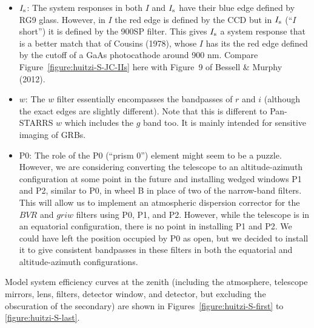 \begin{itemize}
\item $\mbox{$I_\mathrm{s}$}$: The system responses in both $I$ and $\mbox{$I_\mathrm{s}$}$ have their blue edge defined by RG9 glass. However, in $I$ the red edge is defined by the CCD but in $\mbox{$I_\mathrm{s}$}$ (“$I$ short”) it is defined by the 900SP filter. This gives $\mbox{$I_\mathrm{s}$}$ a system response that is a better match that of Cousins (1978), whose $I$ has its the red edge defined by the cutoff of a GaAs photocathode around 900 nm. Compare Figure~\ref{figure:huitzi-S-JC-IIs} here with Figure~9 of Bessell \& Murphy (2012).

\item
$w$: The $w$ filter essentially encompasses the bandpasses of $r$ and $i$ (although the exact edges are slightly different). Note that this is different to Pan-STARRS $w$ which includes the $g$ band too. It is mainly intended for sensitive imaging of GRBs.

\item P0: The role of the P0 (“prism 0”) element might seem to be a puzzle. However, we are considering converting the telescope to an altitude-azimuth configuration at some point in the future and installing wedged windows P1 and P2, similar to P0, in wheel B in place of two of the narrow-band filters. This will allow us to implement an atmospheric dispersion corrector  for the $BVR$ and $griw$ filters using P0, P1, and P2. However, while the telescope is in an equatorial configuration, there is no point in installing P1 and P2. We could have left the position occupied by P0 as open, but we decided to install it to give consistent bandpasses in these filters in both the equatorial and altitude-azimuth configurations.

\end{itemize}

Model system efficiency curves at the zenith (including the atmosphere, telescope mirrors, lens, filters, detector window, and detector, but excluding the obscuration of the secondary) are shown in Figures~\ref{figure:huitzi-S-first} to \ref{figure:huitzi-S-last}.

